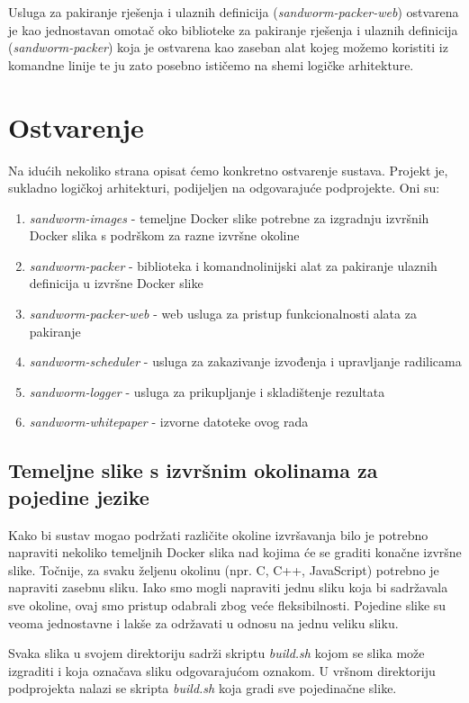 \documentclass[times, utf8, zavrsni]{fer}
\begin{document}
Usluga za pakiranje rješenja i ulaznih definicija ({\textit{sandworm-packer-web}}) ostvarena je kao jednostavan omotač oko biblioteke za pakiranje rješenja i ulaznih definicija ({\textit{sandworm-packer}}) koja je ostvarena kao zaseban alat kojeg možemo koristiti iz komandne linije te ju zato posebno ističemo na shemi logičke arhitekture.


\section{Ostvarenje}

Na idućih nekoliko strana opisat ćemo konkretno ostvarenje sustava. Projekt je, sukladno logičkoj arhitekturi, podijeljen na odgovarajuće podprojekte. Oni su:

\begin{enumerate}
\item {\textit{sandworm-images}} - temeljne Docker slike potrebne za izgradnju izvršnih Docker slika s podrškom za razne izvršne okoline
\item {\textit{sandworm-packer}} - biblioteka i komandnolinijski alat za pakiranje ulaznih definicija u izvršne Docker slike
\item {\textit{sandworm-packer-web}} - web usluga za pristup funkcionalnosti alata za pakiranje
\item {\textit{sandworm-scheduler}} - usluga za zakazivanje izvođenja i upravljanje radilicama
\item {\textit{sandworm-logger}} - usluga za prikupljanje i skladištenje rezultata
\item {\textit{sandworm-whitepaper}} - izvorne datoteke ovog rada
\end{enumerate}


\subsection{Temeljne slike s izvršnim okolinama za pojedine jezike}

Kako bi sustav mogao podržati različite okoline izvršavanja bilo je potrebno napraviti nekoliko temeljnih Docker slika nad kojima će se graditi konačne izvršne slike. Točnije, za svaku željenu okolinu (npr. C, C++, JavaScript) potrebno je napraviti zasebnu sliku. Iako smo mogli napraviti jednu sliku koja bi sadržavala sve okoline, ovaj smo pristup odabrali zbog veće fleksibilnosti. Pojedine slike su veoma jednostavne i lakše za održavati u odnosu na jednu veliku sliku.

Svaka slika u svojem direktoriju sadrži skriptu {\textit{build.sh}} kojom se slika može izgraditi i koja označava sliku odgovarajućom oznakom. U vršnom direktoriju podprojekta nalazi se skripta {\textit{build.sh}} koja gradi sve pojedinačne slike.
\end{document}
